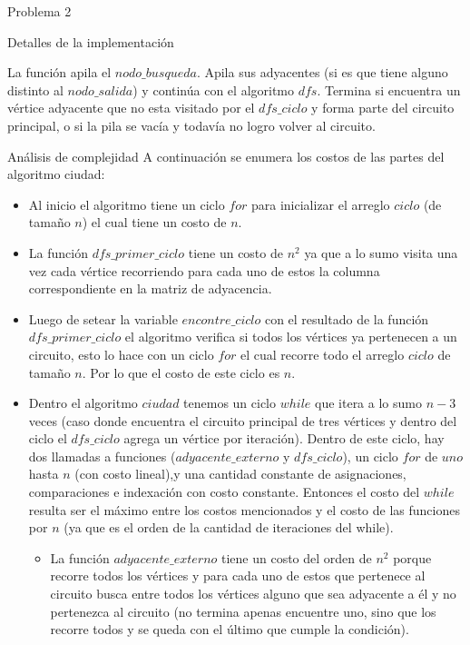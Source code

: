 \begin{section}{Problema 2}
\begin{subsection}{Detalles de la implementación}
\begin{itemize}
			La función apila el $nodo\_busqueda$. Apila sus adyacentes (si es que tiene alguno distinto al $nodo\_salida$) y continúa con el algoritmo $dfs$. Termina si encuentra un vértice adyacente que no esta visitado por el $dfs\_ciclo$ y forma parte del circuito principal, o si la pila se vacía y todavía no logro volver al circuito.
		\end{itemize}
	\end{subsection}


	\begin{subsection}{Análisis de complejidad}
		A continuación se enumera los costos de las partes del algoritmo ciudad:

		\begin{itemize}
		\item Al inicio el algoritmo tiene un ciclo $for$ para inicializar el arreglo $ciclo$ (de tamaño $n$) el cual tiene un costo de $n$.
		
		\item La función $dfs\_primer\_ciclo$ tiene un costo de $n^2$ ya que a lo sumo visita una vez cada vértice recorriendo para cada uno de estos la columna correspondiente en la matriz de adyacencia.
	
		\item Luego de setear la variable $encontre\_ciclo$ con el resultado de la función $dfs\_primer\_ciclo$ el algoritmo verifica si todos los vértices ya pertenecen a un circuito, esto lo hace con un ciclo $for$ el cual recorre todo el arreglo $ciclo$ de tamaño $n$. Por lo que el costo de este ciclo es $n$.

		\item Dentro el algoritmo $ciudad$ tenemos un ciclo $while$ que itera a lo sumo $n-3$ veces (caso donde encuentra el circuito principal de tres vértices y dentro del ciclo el $dfs\_ciclo$ agrega un vértice por iteración). Dentro de este ciclo, hay dos llamadas a funciones ($adyacente\_externo$ y $dfs\_ciclo$), un ciclo $for$ de $uno$ hasta $n$ (con costo lineal),y una cantidad constante de asignaciones, comparaciones e indexación con costo constante. Entonces el costo del $while$ resulta ser el máximo entre los costos mencionados y el costo de las funciones por $n$ (ya que es el orden de la cantidad de iteraciones del while).
				
			\begin{itemize}
			\item La función $adyacente\_externo$ tiene un costo del orden de $n^2$ porque recorre todos los vértices y para cada uno de estos que pertenece al circuito busca entre todos los vértices alguno que sea adyacente a él y no pertenezca al circuito (no termina apenas encuentre uno, sino que los recorre todos y se queda con el último que cumple la condición).
	

\end{itemize}
\end{itemize}
\end{subsection}
\end{section}
